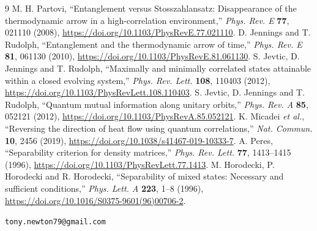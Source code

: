 \documentclass[11pt,a4paper]{article}
\begin{document}
\begin{thebibliography}{9}
 M. H. Partovi, ``Entanglement versus Stosszahlansatz: Disappearance of the thermodynamic arrow in a high-correlation environment,'' \emph{Phys. Rev. E} \textbf{77}, 021110 (2008), \url{https://doi.org/10.1103/PhysRevE.77.021110}.
 D. Jennings and T. Rudolph, ``Entanglement and the thermodynamic arrow of time,'' \emph{Phys. Rev. E} \textbf{81}, 061130 (2010), \url{https://doi.org/10.1103/PhysRevE.81.061130}.
 S. Jevtic, D. Jennings and T. Rudolph, ``Maximally and minimally correlated states attainable within a closed evolving system,'' \emph{Phys. Rev. Lett.} \textbf{108}, 110403 (2012), \url{https://doi.org/10.1103/PhysRevLett.108.110403}.
 S. Jevtic, D. Jennings and T. Rudolph, ``Quantum mutual information along unitary orbits,'' \emph{Phys. Rev. A} \textbf{85}, 052121 (2012), \url{https://doi.org/10.1103/PhysRevA.85.052121}.
 K. Micadei \emph{et al.}, ``Reversing the direction of heat flow using quantum correlations,'' \emph{Nat. Commun.} \textbf{10}, 2456 (2019), \url{https://doi.org/10.1038/s41467-019-10333-7}.
 A. Peres, ``Separability criterion for density matrices,'' \emph{Phys. Rev. Lett.} \textbf{77}, 1413--1415 (1996), \url{https://doi.org/10.1103/PhysRevLett.77.1413}.
 M. Horodecki, P. Horodecki and R. Horodecki, ``Separability of mixed states: Necessary and sufficient conditions,'' \emph{Phys. Lett. A} \textbf{223}, 1--8 (1996), \url{https://doi.org/10.1016/S0375-9601(96)00706-2}.
\end{thebibliography}

\noindent\texttt{tony.newton79@gmail.com}
\end{document}

